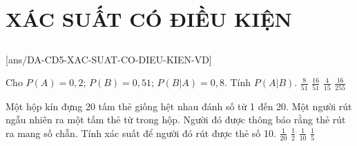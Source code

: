 \section{XÁC SUẤT CÓ ĐIỀU KIỆN}
\subsection{\vdmh}
[ans/DA-CD5-XAC-SUAT-CO-DIEU-KIEN-VD]
\begin{vd} %
    Cho $P(A) = 0,2$; $P(B) = 0,51$; $P(B | A) = 0,8$. Tính $P(A | B)$.
    \choice
    { $\frac{8}{51}$ }
    {\True $\frac{16}{51}$ }
    { $\frac{4}{15}$ }
    { $\frac{16}{255}$ }
\end{vd}
\begin{vd} %
    Một hộp kín đựng 20 tấm thẻ giống hệt nhau đánh số từ 1 đến 20. Một người rút ngẫu nhiên ra một tấm thẻ từ trong hộp. Người đó được thông báo rằng thẻ rút ra mang số chẵn. Tính xác suất để người đó rút được thẻ số 10.
    \choice
    { $\frac{1}{20}$ }
    { $\frac{1}{2}$ }
    {\True $\frac{1}{10}$ }
    { $\frac{1}{5}$ }
\end{vd}
